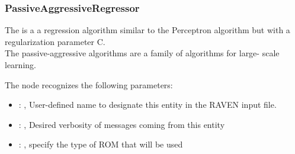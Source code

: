 \subsubsection{PassiveAggressiveRegressor}
  The                          is a a regression algorithm
  similar to the Perceptron algorithm                         but with a regularization parameter C.
  \\The passive-aggressive algorithms are a family of algorithms for                         large-
  scale learning.                         

  The  node recognizes the following parameters:
    \begin{itemize}
      \item {}: , 
        User-defined name to designate this entity in the RAVEN input file.
      \item {}: , 
        Desired verbosity of messages coming from this entity
      \item {}: , 
        specify the type of ROM that will be used
  \end{itemize}

